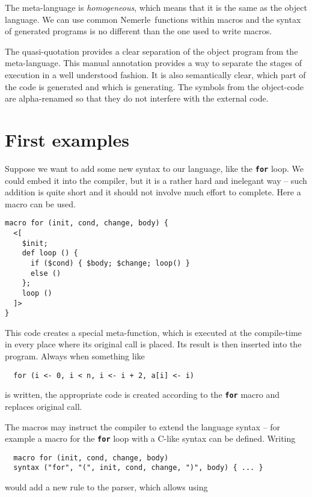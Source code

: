 \documentclass{llncs}
\newcommand{\nem}[0]{Nemerle}
\newcommand{\kw}[1]{{\tt \bf #1}}
\begin{document}
The meta-language is \emph{homogeneous}, which means that it is the same as the 
object language. We can use common \nem\ functions within macros and the syntax 
of generated programs is no different than the one used to write macros.

The quasi-quotation provides a clear separation of the object program from 
the meta-language. This manual annotation provides a way to separate the stages
of execution in a well understood fashion. It is also semantically clear, which 
part of the code is generated and which is generating. The symbols from the 
object-code are alpha-renamed so that they do not interfere with the external code. 

\section{First examples}
Suppose we want to add some new syntax to our language, like the \kw{for} loop.
We could embed it into the compiler, but it is a rather hard and inelegant way -- such 
addition is quite short and it should not involve much effort to complete. 
Here a macro can be used.

\begin{verbatim}
macro for (init, cond, change, body) {
  <[ 
    $init;
    def loop () {
      if ($cond) { $body; $change; loop() } 
      else () 
    }; 
    loop ()
  ]>
}
\end{verbatim}

This code creates a special meta-function, which is executed at the compile-time
in every place where its original call is placed. Its result is then inserted 
into the program. Always when something like

\begin{verbatim}
  for (i <- 0, i < n, i <- i + 2, a[i] <- i)
\end{verbatim}

\noindent
is written, the appropriate code is created according to the \kw{for} macro and 
replaces original call.

The macros may instruct the compiler to extend the language syntax -- for example 
a macro for the \kw{for} loop with a C-like syntax can be defined. Writing

\begin{verbatim}
  macro for (init, cond, change, body) 
  syntax ("for", "(", init, cond, change, ")", body) { ... }
\end{verbatim}

\noindent
would add a new rule to the parser, which allows using
\end{document}
